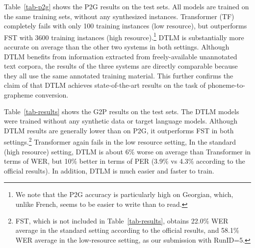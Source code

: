 \documentclass[11pt,a4paper]{article}
\newcommand{\ngram}{FST}
\newcommand{\tf}{TF}
\newcommand{\transformer}{{\sc Transformer}}
\begin{document}
Table~\ref{tab-p2g} shows the P2G results on the test sets.
All models are trained on the same training sets, 
without any synthesized instances.
{\transformer} (\tf) 
completely fails with only 100 training instances (low resource),
but outperforms {\ngram} with 3600 training instances
(high resource).\footnote{We note that the P2G accuracy is particularly high 
on Georgian, which, unlike French, seems to be easier to write than to read.}
DTLM is substantially more accurate on average than the other two systems
in both settings.
Although DTLM benefits from information extracted from freely-available
unannotated text corpora, 
the results of the three systems are directly comparable 
because they all use the same annotated training material.
This further confirms the claim of 
that DTLM achieves
state-of-the-art results on the task of phoneme-to-grapheme conversion.






 
Table~\ref{tab-results} shows the G2P results on the test sets.
The DTLM models were trained without any synthetic data
or target language models.
Although DTLM results are generally lower than on P2G,
it outperforms FST in both settings.\footnote{
FST, which is not included in Table~\ref{tab-results},
obtains 22.0\% WER average in the standard setting
according to the official results,
and 58.1\% WER average in the low-resource setting,
as our submission with RunID=5.}
{\transformer} again fails in the low resource setting,
In the standard (high resource) setting,
DTLM is about 6\% worse on average than {\transformer}
in terms of WER, %
but 10\% better in terms of PER %
(3.9\% vs 4.3\% according to the official results).
In addition, DTLM is much easier and faster to train.
\end{document}
